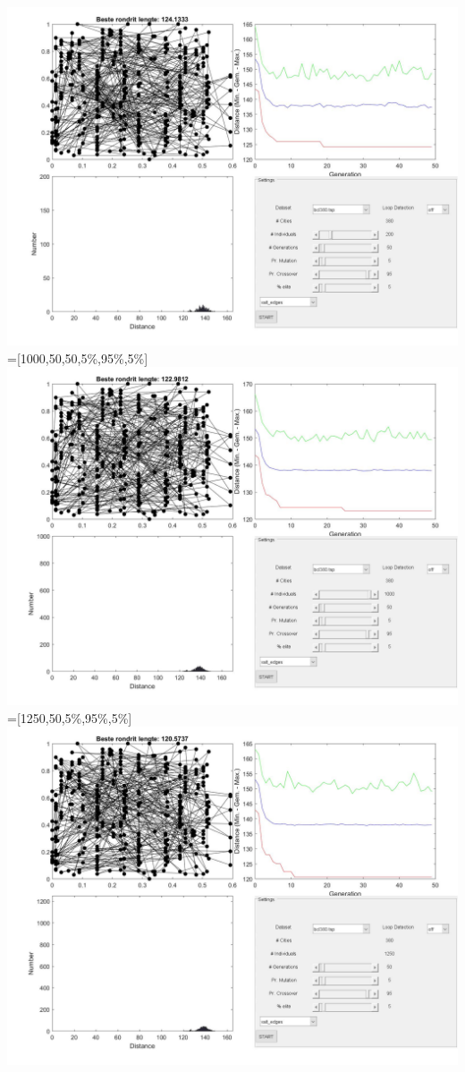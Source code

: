 \includegraphics[width=\textwidth]{img/specific/order_crossover/general_2.jpg}\\
 =[1000,50,50,5\%,95\%,5\%] \\
\includegraphics[width=\textwidth]{img/specific/order_crossover/general_3.jpg}\\
 =[1250,50,5\%,95\%,5\%]\\
\includegraphics[width=\textwidth]{img/specific/order_crossover/general_4.jpg}\\
